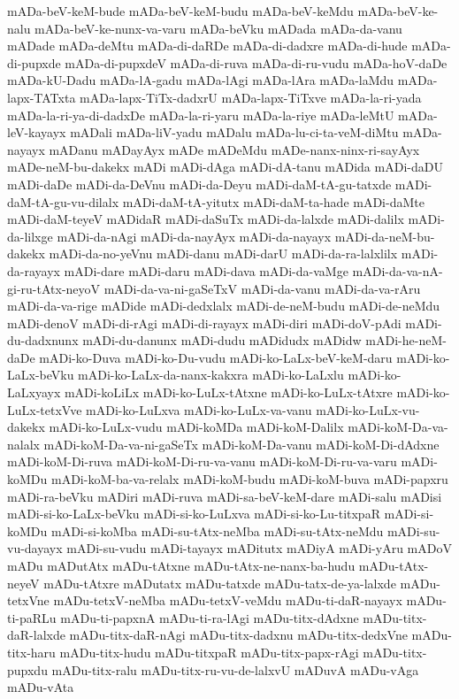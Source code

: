 {mADa-beV-keM-bude
mADa-beV-keM-budu
mADa-beV-keMdu
mADa-beV-ke-nalu
mADa-beV-ke-nunx-va-varu
mADa-beVku
mADada
mADa-da-vanu
mADade
mADa-deMtu
mADa-di-daRDe
mADa-di-dadxre
mADa-di-hude
mADa-di-pupxde
mADa-di-pupxdeV
mADa-di-ruva
mADa-di-ru-vudu
mADa-hoV-daDe
mADa-kU-Dadu
mADa-lA-gadu
mADa-lAgi
mADa-lAra
mADa-laMdu
mADa-lapx-TATxta
mADa-lapx-TiTx-dadxrU
mADa-lapx-TiTxve
mADa-la-ri-yada
mADa-la-ri-ya-di-dadxDe
mADa-la-ri-yaru
mADa-la-riye
mADa-leMtU
mADa-leV-kayayx
mADali
mADa-liV-yadu
mADalu
mADa-lu-ci-ta-veM-diMtu
mADa-nayayx
mADanu
mADayAyx
mADe
mADeMdu
mADe-nanx-ninx-ri-sayAyx
mADe-neM-bu-dakekx
mADi
mADi-dAga
mADi-dA-tanu
mADida
mADi-daDU
mADi-daDe
mADi-da-DeVnu
mADi-da-Deyu
mADi-daM-tA-gu-tatxde
mADi-daM-tA-gu-vu-dilalx
mADi-daM-tA-yitutx
mADi-daM-ta-hade
mADi-daMte
mADi-daM-teyeV
mADidaR
mADi-daSuTx
mADi-da-lalxde
mADi-dalilx
mADi-da-lilxge
mADi-da-nAgi
mADi-da-nayAyx
mADi-da-nayayx
mADi-da-neM-bu-dakekx
mADi-da-no-yeVnu
mADi-danu
mADi-darU
mADi-da-ra-lalxlilx
mADi-da-rayayx
mADi-dare
mADi-daru
mADi-dava
mADi-da-vaMge
mADi-da-va-nA-gi-ru-tAtx-neyoV
mADi-da-va-ni-gaSeTxV
mADi-da-vanu
mADi-da-va-rAru
mADi-da-va-rige
mADide
mADi-dedxlalx
mADi-de-neM-budu
mADi-de-neMdu
mADi-denoV
mADi-di-rAgi
mADi-di-rayayx
mADi-diri
mADi-doV-pAdi
mADi-du-dadxnunx
mADi-du-danunx
mADi-dudu
mADidudx
mADidw
mADi-he-neM-daDe
mADi-ko-Duva
mADi-ko-Du-vudu
mADi-ko-LaLx-beV-keM-daru
mADi-ko-LaLx-beVku
mADi-ko-LaLx-da-nanx-kakxra
mADi-ko-LaLxlu
mADi-ko-LaLxyayx
mADi-koLiLx
mADi-ko-LuLx-tAtxne
mADi-ko-LuLx-tAtxre
mADi-ko-LuLx-tetxVve
mADi-ko-LuLxva
mADi-ko-LuLx-va-vanu
mADi-ko-LuLx-vu-dakekx
mADi-ko-LuLx-vudu
mADi-koMDa
mADi-koM-Dalilx
mADi-koM-Da-va-nalalx
mADi-koM-Da-va-ni-gaSeTx
mADi-koM-Da-vanu
mADi-koM-Di-dAdxne
mADi-koM-Di-ruva
mADi-koM-Di-ru-va-vanu
mADi-koM-Di-ru-va-varu
mADi-koMDu
mADi-koM-ba-va-relalx
mADi-koM-budu
mADi-koM-buva
mADi-papxru
mADi-ra-beVku
mADiri
mADi-ruva
mADi-sa-beV-keM-dare
mADi-salu
mADisi
mADi-si-ko-LaLx-beVku
mADi-si-ko-LuLxva
mADi-si-ko-Lu-titxpaR
mADi-si-koMDu
mADi-si-koMba
mADi-su-tAtx-neMba
mADi-su-tAtx-neMdu
mADi-su-vu-dayayx
mADi-su-vudu
mADi-tayayx
mADitutx
mADiyA
mADi-yAru
mADoV
mADu
mADutAtx
mADu-tAtxne
mADu-tAtx-ne-nanx-ba-hudu
mADu-tAtx-neyeV
mADu-tAtxre
mADutatx
mADu-tatxde
mADu-tatx-de-ya-lalxde
mADu-tetxVne
mADu-tetxV-neMba
mADu-tetxV-veMdu
mADu-ti-daR-nayayx
mADu-ti-paRLu
mADu-ti-papxnA
mADu-ti-ra-lAgi
mADu-titx-dAdxne
mADu-titx-daR-lalxde
mADu-titx-daR-nAgi
mADu-titx-dadxnu
mADu-titx-dedxVne
mADu-titx-haru
mADu-titx-hudu
mADu-titxpaR
mADu-titx-papx-rAgi
mADu-titx-pupxdu
mADu-titx-ralu
mADu-titx-ru-vu-de-lalxvU
mADuvA
mADu-vAga
mADu-vAta
}
